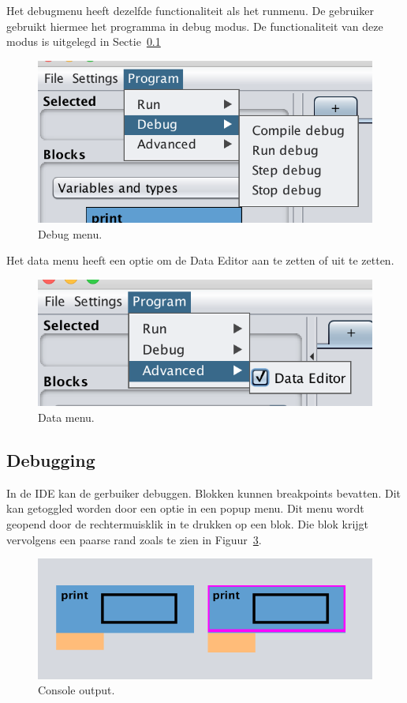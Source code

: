 \documentclass[]{article}
\begin{document}
Het debugmenu heeft dezelfde functionaliteit als het runmenu. De gebruiker gebruikt hiermee het programma in debug modus. De functionaliteit van deze modus is uitgelegd in Sectie~\ref{debuggingdoc}
\begin{figure}[H]
  \centering
\includegraphics[scale=0.65]{Documentatie/images/menu/debugmenu}
  \caption{Debug menu.} 
  \label{debugmenu}
\end{figure}
Het data menu heeft een optie om de Data Editor aan te zetten of uit te zetten. 
\begin{figure}[H]
  \centering
\includegraphics[scale=0.65]{Documentatie/images/menu/datamenu}
  \caption{Data menu.} 
  \label{datamenu}
\end{figure}

\subsection{Debugging}
\label{debuggingdoc}
In de IDE kan de gerbuiker debuggen. Blokken kunnen breakpoints bevatten. Dit kan getoggled worden door een optie in een popup menu. Dit menu wordt geopend door de rechtermuisklik in te drukken op een blok. Die blok krijgt vervolgens een paarse rand zoals te zien in Figuur~\ref{breakdoc}.
\begin{figure}[H]
  \centering
\includegraphics[scale=0.65]{Documentatie/images/break}
  \caption{Console output.} 
  \label{breakdoc}
\end{figure}
\end{document}
